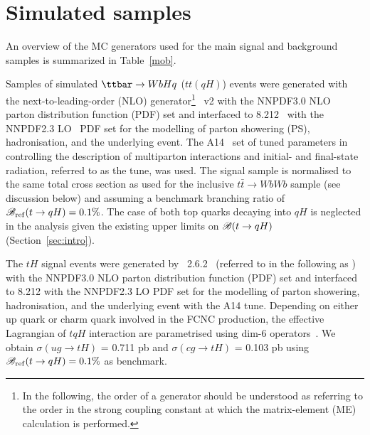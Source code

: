 \section{Simulated samples}
\label{sec:simulations}

An overview of the MC generators used for the main signal and background samples is summarized in Table~\ref{mob}.

Samples of simulated $\ttbar \to WbHq$ ($tt(qH)$) events were generated with the next-to-leading-order (NLO) generator\footnote{In the following, 
the order of a generator should be understood as referring to the order in the strong coupling constant at which the matrix-element (ME) calculation 
is performed.} {\powheg}~v2 \cite{Frixione:2007nw,Nason:2004rx,Frixione:2007vw,Alioli:2010xd}
with the NNPDF3.0 NLO~\cite{Ball:2014uwa} parton distribution function (PDF) set and interfaced to {\pythia} 8.212~\cite{Sjostrand:2007gs} with the NNPDF2.3 LO~\cite{Ball:2012cx} PDF set for the modelling of parton showering (PS), hadronisation, and the underlying event. 
The A14~\cite{ATLASUETune4} set of tuned parameters in {\pythia} controlling the description of multiparton interactions and  
initial- and final-state radiation, referred to as the tune, was used.
The signal sample is normalised to the same total cross section as used for the inclusive $t\bar{t}\to WbWb$ sample (see discussion below) and
assuming a benchmark branching ratio of $\mathscr{B}_{\mathrm{ref}}(t\to qH)=0.1\%$.
The case of both top quarks decaying into $qH$ is neglected in the analysis given the existing upper limits on $\mathscr{B}(t \to qH)$ (Section~\ref{sec:intro}).

The $tH$ signal events were generated by {\amcatnlolong}~2.6.2~\cite{Alwall:2014hca}  (referred to in the following as {\amcatnlo})
with the NNPDF3.0 NLO parton distribution function (PDF) set and interfaced to {\pythia} 8.212 with the NNPDF2.3 LO PDF set for the modelling of parton showering,
hadronisation, and the underlying event with the A14 tune.
Depending on either up quark or charm quark involved in the FCNC production, the effective Lagrangian of $tqH$ interaction are parametrised using
dim-6 operators~\cite{fcnc_production_theory}. We obtain $\sigma(ug\to tH)$ = 0.711 pb and $\sigma(cg\to tH)$ = 0.103 pb using $\mathscr{B}_{\mathrm{ref}}(t\to qH)=0.1\%$ as benchmark.   

